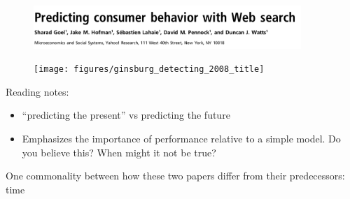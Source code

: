 \documentclass[aspectratio=169]{beamer}
\begin{document}
\begin{frame}

\begin{figure}
  \includegraphics[width = 0.9\textwidth]{figures/goel_predicting_2010_title}
\end{figure}

\end{frame}
\begin{frame}

\begin{figure}
  \texttt{[image: figures/ginsburg\_detecting\_2008\_title]}
\end{figure}

\end{frame}
\begin{frame}

Reading notes:
\begin{itemize}
\item ``predicting the present'' vs predicting the future
\pause
\item Emphasizes the importance of performance relative to a simple model.  Do you believe this? When might it not be true?
\end{itemize}

\end{frame}
\begin{frame}

One commonality between how these two papers differ from their predecessors: time

\end{frame}




\frame{\titlepage}
\end{document}
